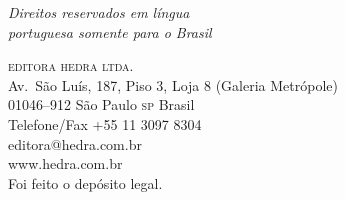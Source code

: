 \textit{Direitos reservados em língua\\ 
portuguesa somente para o Brasil}\\\medskip

\textsc{editora hedra ltda.}\\
Av.~São Luís, 187, Piso 3, Loja 8 (Galeria Metrópole)\\
01046--912 São Paulo \textsc{sp} Brasil\\
Telefone/Fax +55 11 3097 8304\\\smallskip
editora@hedra.com.br\\
www.hedra.com.br\\
\bigskip
Foi feito o depósito legal.

\endgroup
\pagebreak